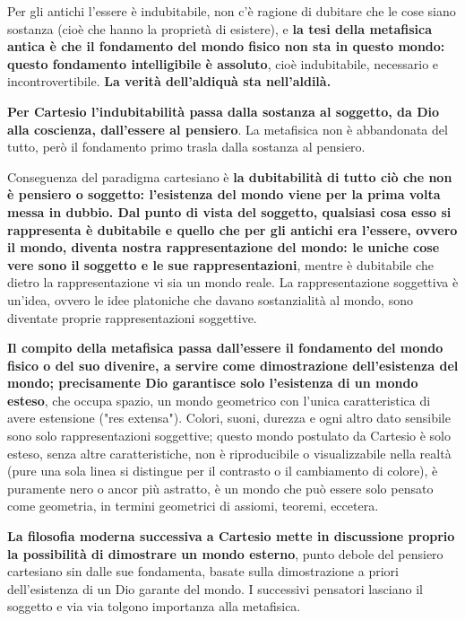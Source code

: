Per gli antichi l'essere è indubitabile, non c'è ragione di dubitare che le cose siano sostanza (cioè che hanno la proprietà di esistere), e \textbf{la tesi della metafisica antica è che il fondamento del mondo fisico non sta in questo mondo: questo fondamento intelligibile è assoluto}, cioè indubitabile, necessario e incontrovertibile. \textbf{La verità dell'aldiquà sta nell'aldilà.}

\textbf{Per Cartesio l'indubitabilità passa dalla sostanza al soggetto, da Dio alla coscienza, dall'essere al pensiero}. La metafisica non è abbandonata del tutto, però il fondamento primo trasla dalla sostanza al pensiero.

Conseguenza del paradigma cartesiano è \textbf{la dubitabilità di tutto ciò che non è pensiero o soggetto: l'esistenza del mondo viene per la prima volta messa in dubbio. Dal punto di vista del soggetto, qualsiasi cosa esso si rappresenta è dubitabile e quello che per gli antichi era l'essere, ovvero il mondo, diventa nostra rappresentazione del mondo: le uniche cose vere sono il soggetto e le sue rappresentazioni}, mentre è dubitabile che dietro la rappresentazione vi sia un mondo reale. La rappresentazione soggettiva è un'idea, ovvero le idee platoniche che davano sostanzialità al mondo, sono diventate proprie rappresentazioni soggettive.

\textbf{Il compito della metafisica passa dall'essere il fondamento del mondo fisico o del suo divenire, a servire come dimostrazione dell'esistenza del mondo; precisamente Dio garantisce solo l'esistenza di un mondo esteso}, che occupa spazio, un mondo geometrico con l'unica caratteristica di avere estensione ("res extensa"). Colori, suoni, durezza e ogni altro dato sensibile sono solo rappresentazioni soggettive; questo mondo postulato da Cartesio è solo esteso, senza altre caratteristiche, non è riproducibile o visualizzabile nella realtà (pure una sola linea si distingue per il contrasto o il cambiamento di colore), è puramente nero o ancor più astratto, è un mondo che può essere solo pensato come geometria, in termini geometrici di assiomi, teoremi, eccetera.

\textbf{La filosofia moderna successiva a Cartesio mette in discussione proprio la possibilità di dimostrare un mondo esterno}, punto debole del pensiero cartesiano sin dalle sue fondamenta, basate sulla dimostrazione a priori dell'esistenza di un Dio garante del mondo. I successivi pensatori lasciano il soggetto e via via tolgono importanza alla metafisica.

